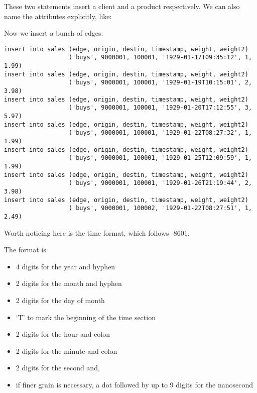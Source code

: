 These two statements insert a client and a product respectively.
We can also name the attributes explicitly, like:


Now we insert a bunch of edges:

\begin{verbatim}
insert into sales (edge, origin, destin, timestamp, weight, weight2)
                  ('buys', 9000001, 100001, '1929-01-17T09:35:12', 1, 1.99)
insert into sales (edge, origin, destin, timestamp, weight, weight2)
                  ('buys', 9000001, 100001, '1929-01-19T10:15:01', 2, 3.98)
insert into sales (edge, origin, destin, timestamp, weight, weight2)
                  ('buys', 9000001, 100001, '1929-01-20T17:12:55', 3, 5.97)
insert into sales (edge, origin, destin, timestamp, weight, weight2)
                  ('buys', 9000001, 100001, '1929-01-22T08:27:32', 1, 1.99)
insert into sales (edge, origin, destin, timestamp, weight, weight2)
                  ('buys', 9000001, 100001, '1929-01-25T12:09:59', 1, 1.99)
insert into sales (edge, origin, destin, timestamp, weight, weight2)
                  ('buys', 9000001, 100001, '1929-01-26T21:19:44', 2, 3.98)
insert into sales (edge, origin, destin, timestamp, weight, weight2)
                  ('buys', 9000001, 100002, '1929-01-22T08:27:51', 1, 2.49)
\end{verbatim}

Worth noticing here is the time format,
which follows -8601.

The format is
\begin{itemize}
\item 4 digits for the year and hyphen
\item 2 digits for the month and hyphen
\item 2 digits for the day of month
\item `T' to mark the beginning of the time section
\item 2 digits for the hour and colon
\item 2 digits for the minute and colon
\item 2 digits for the second and,
\item if finer grain is necessary,
a dot followed by up to 9 digits
for the nanosecond
\end{itemize}

